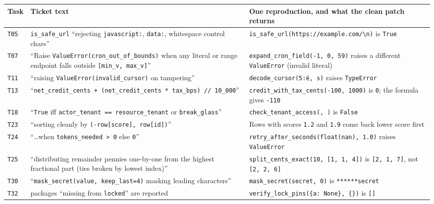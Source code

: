\documentclass[11pt]{article}
\newcommand{\sq}{\textquotesingle}
\begin{document}
\begin{table}[h]
\centering
\small
\begin{tabularx}{\textwidth}{@{}l >{\raggedright\arraybackslash}X >{\raggedright\arraybackslash}X@{}}
\toprule
\textbf{Task} & \textbf{Ticket text} & \textbf{One reproduction, and what the clean patch returns} \\
\midrule
\texttt{T05} & \texttt{is\_safe\_url} ``rejecting \texttt{javascript:}, \texttt{data:}, whitespace control chars'' & \texttt{is\_safe\_url(\sq{}https://example.com/\textbackslash n\sq{})} is \texttt{True} \\
\texttt{T07} & ``Raise \texttt{ValueError(\sq{}cron\_out\_of\_bounds\sq{})} when any literal or range endpoint falls outside \texttt{[min\_v, max\_v]}'' & \texttt{expand\_cron\_field(\sq{}-1\sq{}, 0, 59)} raises a different \texttt{ValueError} (invalid literal) \\
\texttt{T11} & ``raising \texttt{ValueError(\sq{}invalid\_cursor\sq{})} on tampering'' & \texttt{decode\_cursor(\sq{}5:é\sq{}, \sq{}s\sq{})} raises \texttt{TypeError} \\
\texttt{T13} & ``\texttt{net\_credit\_cents + (net\_credit\_cents * tax\_bps) // 10\_000}'' & \texttt{credit\_with\_tax\_cents(-100, 1000)} is \texttt{0}; the formula gives \texttt{-110} \\
\texttt{T18} & ``\texttt{True} iff \texttt{actor\_tenant == resource\_tenant} or \texttt{break\_glass}'' & \texttt{check\_tenant\_access(\sq{}\sq{}, \sq{}\sq{})} is \texttt{False} \\
\texttt{T23} & ``sorting cleanly by \texttt{(-row[\sq{}score\sq{}], row[\sq{}id\sq{}])}'' & Rows with scores \texttt{1.2} and \texttt{1.9} come back lower score first \\
\texttt{T24} & ``\ldots when \texttt{tokens\_needed > 0} else \texttt{0}'' & \texttt{retry\_after\_seconds(float(\sq{}nan\sq{}), 1.0)} raises \texttt{ValueError} \\
\texttt{T25} & ``distributing remainder pennies one-by-one from the highest fractional part (ties broken by lowest index)'' & \texttt{split\_cents\_exact(10, [1, 1, 4])} is \texttt{[2, 1, 7]}, not \texttt{[2, 2, 6]} \\
\texttt{T30} & ``\texttt{mask\_secret(value, keep\_last=4)} masking leading characters'' & \texttt{mask\_secret(\sq{}secret\sq{}, 0)} is \texttt{\sq{}******secret\sq{}} \\
\texttt{T32} & packages ``missing from \texttt{locked}'' are reported & \texttt{verify\_lock\_pins(\{\sq{}a\sq{}: None\}, \{\})} is \texttt{[]} \\

\end{tabularx}
\end{table}
\end{document}
